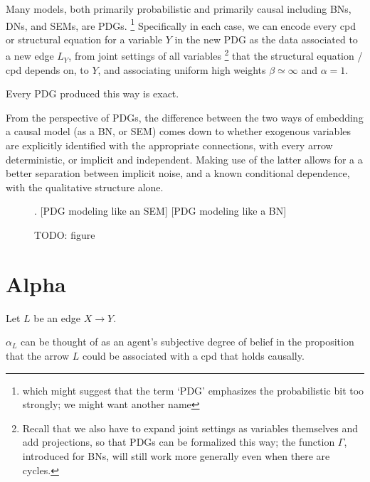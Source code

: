 \documentclass{article}
\newcommand{\N}{\mathcal N}
\newcommand{\Ar}{\mathcal A}
\newcommand{\dg}[1]{\mathsf #1}
\theoremstyle{plain}
\newtheorem{claim}[theorem]{Claim}
\theoremstyle{definition}
\theoremstyle{remark}
\begin{document}
Many models, both primarily probabilistic and primarily causal including BNs, DNs, and SEMs, are PDGs.%
	\footnote{which might suggest that the term `PDG' emphasizes the probabilistic bit too strongly; we might want another name}
Specifically in each case, we can encode every cpd or structural equation for a variable $Y$ in the new PDG as the data associated to a new edge $L_Y$, from joint settings of all variables%
		\footnote{Recall that we also have to expand joint settings as variables themselves and add projections, so that PDGs can be formalized this way; the function $\Gamma$, introduced for BNs, will still work more generally even when there are cycles.}
that the structural equation / cpd depends on, to $Y$, and associating uniform high weights $\beta \simeq \infty$ and $\alpha = 1$.%

Every PDG produced this way is exact.

From the perspective of PDGs, the difference between the two ways of embedding a causal model (as a BN, or SEM) comes down to whether exogenous variables are explicitly identified with the appropriate connections, with every arrow deterministic, or implicit and independent. Making use of the latter allows for a a better separation between implicit noise, and a known conditional dependence, with the qualitative structure alone.


\begin{figure}.
	[PDG modeling like an SEM] [PDG modeling like a BN] 
	\caption{TODO: figure}
\end{figure}

%


\section{Alpha}



Let $L$ be an edge $X \to Y$. 

$\alpha_L$ can be thought of as an agent's subjective degree of belief in the proposition that the arrow $L$ could be associated with a cpd that holds causally.
\end{document}
